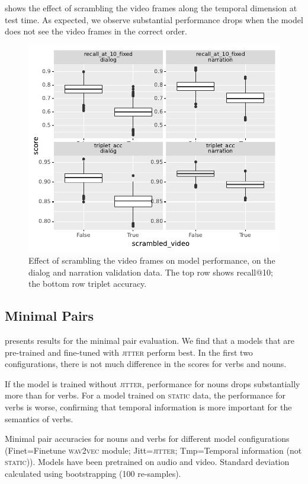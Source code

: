  shows the effect of scrambling the video frames 
along the temporal dimension at test time. As expected, we observe substantial 
performance drops when the model does not see the video frames in 
the correct order.
\begin{figure}[htb]
	\centering
	\includegraphics[width=\columnwidth]{results/ablations/scrambled_video.pdf}
	\caption{Effect of scrambling the video frames on model performance, on the 
	dialog and narration validation data. The top row shows recall@10;
		the bottom row triplet accuracy.}
	\label{fig:scrambled_video}
\end{figure}

\subsection{Minimal Pairs}
\label{sec:minimal-pairs}


 presents results for the minimal pair 
evaluation. We find that a models that are 
pre-trained and fine-tuned with \textsc{jitter} perform best. In the first two 
configurations, there is not much difference in the scores for verbs and nouns.

If the model is trained without \textsc{jitter}, performance for nouns drops 
substantially more than for verbs. For a model trained on \textsc{static} data, 
the performance for verbs is worse, confirming that temporal information is 
more important for the semantics 
of verbs.
\begin{table}[htb]
	
	\caption{Minimal pair accuracies for nouns and verbs for different model 
		configurations (Finet=Finetune \textsc{wav2vec} module; 
		Jitt=\textsc{jitter}; Tmp=Temporal information (not \textsc{static})). 
		Models have been pretrained on audio and video. Standard deviation 
		calculated using bootstrapping (100 re-samples).}
	\label{tab:minimal_pair_results}
\end{table}


